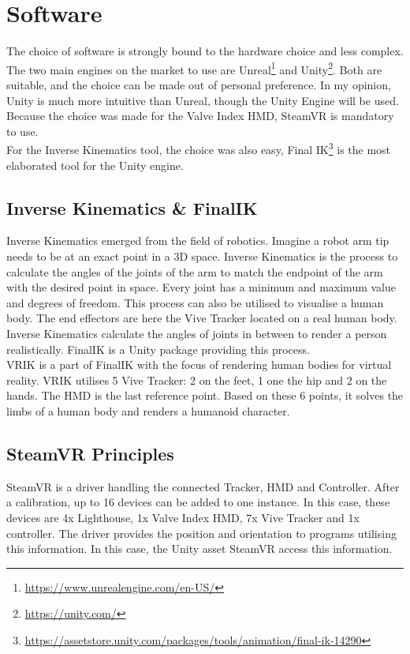 \section{Software}
The choice of software is strongly bound to the hardware choice and less complex. The two main engines on the market to use are Unreal\footnote{\href{https://www.unrealengine.com/en-US/}{https://www.unrealengine.com/en-US/}} and Unity\footnote{\href{https://unity.com/}{https://unity.com/}}. Both are suitable, and the choice can be made out of personal preference. In my opinion, Unity is much more intuitive than Unreal, though the Unity Engine will be used.\\
Because the choice was made for the Valve Index HMD, SteamVR is mandatory to use.\\
For the Inverse Kinematics tool, the choice was also easy, Final IK\footnote{\href{https://assetstore.unity.com/packages/tools/animation/final-ik-14290}{https://assetstore.unity.com/packages/tools/animation/final-ik-14290}} is the most elaborated tool for the Unity engine.

\subsection{Inverse Kinematics \& FinalIK}
Inverse Kinematics emerged from the field of robotics. Imagine a robot arm tip needs to be at an exact point in a 3D space. Inverse Kinematics is the process to calculate the angles of the joints of the arm to match the endpoint of the arm with the desired point in space. Every joint has a minimum and maximum value and degrees of freedom. This process can also be utilised to visualise a human body. The end effectors are here the Vive Tracker located on a real human body. Inverse Kinematics calculate the angles of joints in between to render a person realistically. FinalIK is a Unity package providing this process.\\
VRIK is a part of FinalIK with the focus of rendering human bodies for virtual reality. VRIK utilises 5 Vive Tracker: 2 on the feet, 1 one the hip and 2 on the hands. The HMD is the last reference point. Based on these 6 points, it solves the limbs of a human body and renders a humanoid character.

\subsection{SteamVR Principles}
SteamVR is a driver handling the connected Tracker, HMD and Controller. After a calibration, up to 16 devices can be added to one instance. In this case, these devices are 4x Lighthouse, 1x Valve Index HMD, 7x Vive Tracker and 1x controller. The driver provides the position and orientation to programs utilising this information. In this case, the Unity asset SteamVR access this information.

